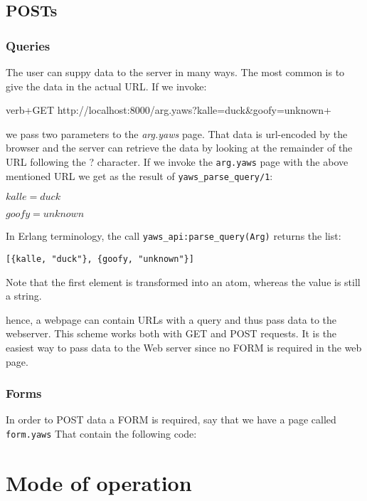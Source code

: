 \documentclass[11pt,oneside,english]{book}
\begin{document}
\section{POSTs}

\subsection{Queries}

The user can suppy data to the server in many ways. The most
common is to give the data in the actual URL.
If we invoke: 

verb+GET http://localhost:8000/arg.yaws?kalle=duck\&goofy=unknown+

we pass two parameters to the \textit{arg.yaws} page.
That data is url-encoded by the browser and the server can retrieve the
data by looking at the remainder of the URL following the ? character.
If we invoke the \verb+arg.yaws+ page with the above mentioned URL we get
as the result of \verb+yaws_parse_query/1+:

$kalle = duck$

$goofy = unknown$

In Erlang terminology, the call \verb+yaws_api:parse_query(Arg)+ returns
the list: 
\begin{verbatim}
[{kalle, "duck"}, {goofy, "unknown"}]
\end{verbatim}

Note that the first element is transformed into an atom, whereas the value
is still a string.

hence, a webpage can contain URLs with a query and thus pass data to the
webserver. This scheme works both with GET and POST requests.
It is the easiest way to pass data to the Web server since no FORM is required
in the web page.


\subsection{Forms}

In order to POST data a FORM is required, say that we have a page called
\verb+form.yaws+ That contain the following code:








\chapter{Mode of operation}
\end{document}
